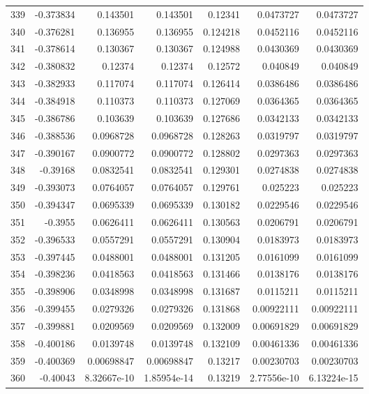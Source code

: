 \begin{tabular}{rrrrrrr}
 339 & -0.373834    & 0.143501    & 0.143501    &  0.12341     & 0.0473727   & 0.0473727   \\
 340 & -0.376281    & 0.136955    & 0.136955    &  0.124218    & 0.0452116   & 0.0452116   \\
 341 & -0.378614    & 0.130367    & 0.130367    &  0.124988    & 0.0430369   & 0.0430369   \\
 342 & -0.380832    & 0.12374     & 0.12374     &  0.12572     & 0.040849    & 0.040849    \\
 343 & -0.382933    & 0.117074    & 0.117074    &  0.126414    & 0.0386486   & 0.0386486   \\
 344 & -0.384918    & 0.110373    & 0.110373    &  0.127069    & 0.0364365   & 0.0364365   \\
 345 & -0.386786    & 0.103639    & 0.103639    &  0.127686    & 0.0342133   & 0.0342133   \\
 346 & -0.388536    & 0.0968728   & 0.0968728   &  0.128263    & 0.0319797   & 0.0319797   \\
 347 & -0.390167    & 0.0900772   & 0.0900772   &  0.128802    & 0.0297363   & 0.0297363   \\
 348 & -0.39168     & 0.0832541   & 0.0832541   &  0.129301    & 0.0274838   & 0.0274838   \\
 349 & -0.393073    & 0.0764057   & 0.0764057   &  0.129761    & 0.025223    & 0.025223    \\
 350 & -0.394347    & 0.0695339   & 0.0695339   &  0.130182    & 0.0229546   & 0.0229546   \\
 351 & -0.3955      & 0.0626411   & 0.0626411   &  0.130563    & 0.0206791   & 0.0206791   \\
 352 & -0.396533    & 0.0557291   & 0.0557291   &  0.130904    & 0.0183973   & 0.0183973   \\
 353 & -0.397445    & 0.0488001   & 0.0488001   &  0.131205    & 0.0161099   & 0.0161099   \\
 354 & -0.398236    & 0.0418563   & 0.0418563   &  0.131466    & 0.0138176   & 0.0138176   \\
 355 & -0.398906    & 0.0348998   & 0.0348998   &  0.131687    & 0.0115211   & 0.0115211   \\
 356 & -0.399455    & 0.0279326   & 0.0279326   &  0.131868    & 0.00922111  & 0.00922111  \\
 357 & -0.399881    & 0.0209569   & 0.0209569   &  0.132009    & 0.00691829  & 0.00691829  \\
 358 & -0.400186    & 0.0139748   & 0.0139748   &  0.132109    & 0.00461336  & 0.00461336  \\
 359 & -0.400369    & 0.00698847  & 0.00698847  &  0.13217     & 0.00230703  & 0.00230703  \\
 360 & -0.40043     & 8.32667e-10 & 1.85954e-14 &  0.13219     & 2.77556e-10 & 6.13224e-15 \\
\hline
\end{tabular}